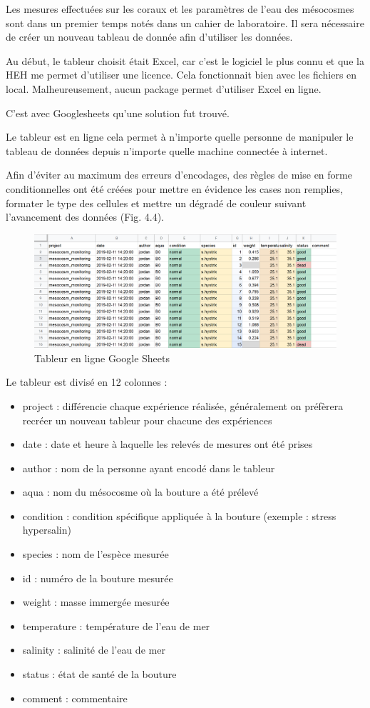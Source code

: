 \documentclass[]{report}
\providecommand{\tightlist}{%
  \setlength{\itemsep}{0pt}\setlength{\parskip}{0pt}}
\begin{document}
Les mesures effectuées sur les coraux et les paramètres de l'eau des
mésocosmes sont dans un premier temps notés dans un cahier de
laboratoire. Il sera nécessaire de créer un nouveau tableau de donnée
afin d'utiliser les données.

Au début, le tableur choisit était Excel, car c'est le logiciel le plus
connu et que la HEH me permet d'utiliser une licence. Cela fonctionnait
bien avec les fichiers en local. Malheureusement, aucun package permet
d'utiliser Excel en ligne.

C'est avec Googlesheets qu'une solution fut trouvé.

Le tableur est en ligne cela permet à n'importe quelle personne de
manipuler le tableau de données depuis n'importe quelle machine
connectée à internet.

Afin d'éviter au maximum des erreurs d'encodages, des règles de mise en
forme conditionnelles ont été créées pour mettre en évidence les cases
non remplies, formater le type des cellules et mettre un dégradé de
couleur suivant l'avancement des données (Fig. 4.4).

\begin{figure}[h!]
\includegraphics[]{../image/tableur-gs.PNG}
\caption{Tableur en ligne Google Sheets}
\end{figure}

Le tableur est divisé en 12 colonnes :

\begin{itemize}
\tightlist
\item
  project : différencie chaque expérience réalisée, généralement on
  préfèrera recréer un nouveau tableur pour chacune des expériences
\item
  date : date et heure à laquelle les relevés de mesures ont été prises
\item
  author : nom de la personne ayant encodé dans le tableur
\item
  aqua : nom du mésocosme où la bouture a été prélevé
\item
  condition : condition spécifique appliquée à la bouture (exemple :
  stress hypersalin)
\item
  species : nom de l'espèce mesurée
\item
  id : numéro de la bouture mesurée
\item
  weight : masse immergée mesurée
\item
  temperature : température de l'eau de mer
\item
  salinity : salinité de l'eau de mer
\item
  status : état de santé de la bouture
\item
  comment : commentaire
\end{itemize}
\end{document}
